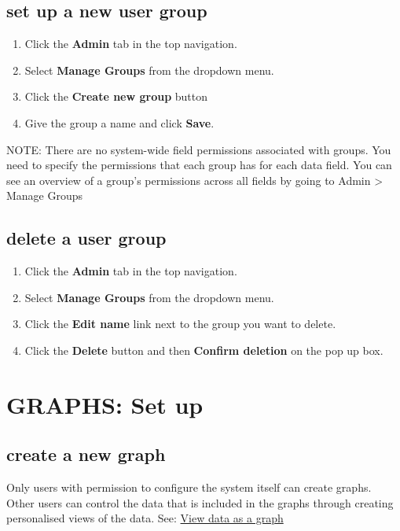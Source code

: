 \documentclass{ctrlo-int-toc}
\begin{document}
\begin{admin}
\subsection[set up a new user group]{set up a new user group}
\begin{enumerate}
    \item Click the \textbf{Admin} tab in the top navigation.
    \item Select \textbf{Manage Groups} from the dropdown menu.
    \item Click the \textbf{Create new group} button
    \item Give the group a name and click \textbf{Save}.
\end{enumerate}
\begin{notebox}
NOTE: There are no system-wide field permissions associated with groups. You need to specify the permissions that each group has for each data field. You can see an overview of a group’s permissions across all fields by going to Admin > Manage Groups
\end{notebox}

\subsection[delete a user group]{delete a user group}
\begin{enumerate}
    \item Click the \textbf{Admin} tab in the top navigation.
    \item Select \textbf{Manage Groups} from the dropdown menu.
    \item Click the \textbf{Edit name} link next to the group you want to delete.
    \item Click the \textbf{Delete} button and then \textbf{Confirm deletion} on the pop up box.
\end{enumerate}

\clearpage\section[GRAPHS: Set up]{GRAPHS: Set up}
\subsection[create a new graph ]{create a new graph }
Only users with permission to configure the system itself can create graphs. Other users can control the data that is included in the graphs through creating personalised views of the data. See: \hyperref[subsec:viewgraph]{View data as a graph}


\end{admin}
\end{document}
